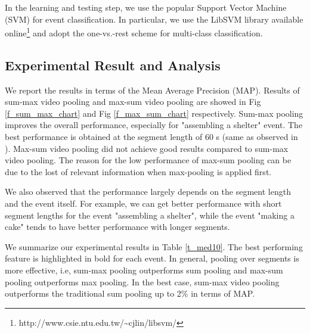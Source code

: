 In the learning and testing step, we use the popular Support Vector Machine (SVM) for event classification. In particular, we use the LibSVM library available online\footnote{http://www.csie.ntu.edu.tw/{\textasciitilde}cjlin/libsvm/} and adopt the one-vs.-rest scheme for multi-class classification. 

\subsection{Experimental Result and Analysis}

We report the results in terms of the Mean Average Precision (MAP). Results of sum-max video pooling and max-sum video pooling are showed in Fig \ref{f_sum_max_chart} and Fig \ref{f_max_sum_chart} respectively. Sum-max pooling improves the overall performance, especially for "assembling a shelter" event. The best performance is obtained at the segment length of 60 s (same as observed in \cite{DBLP:journals/vlsisp/PhanNLTLDS14}). Max-sum video pooling did not achieve good results compared to sum-max video pooling. The reason for the low performance of max-sum pooling can be due to the lost of relevant information when max-pooling is applied first. 

We also observed that the performance largely depends on the segment length and the event itself. For example, we can get better performance with short segment lengths for the event "assembling a shelter", while the event "making a cake" tends to have better performance with longer segments. 

We summarize our experimental results in Table \ref{t_med10}. The best performing feature is highlighted in bold for each event. In general, pooling over segments is more effective, i.e, sum-max pooling outperforms sum pooling and max-sum pooling outperforms max pooling. In the best case, sum-max video pooling outperforms the traditional sum pooling up to 2\% in terms of MAP.

